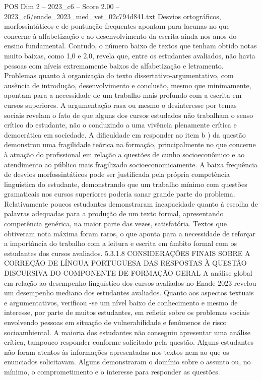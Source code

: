 \begin{textsample}{POS Dim 2 – 2023\_c6 – Score 2.00 – 2023\_c6/enade\_2023\_med\_vet\_02c794d841.txt}
Desvios ortográficos, morfossintáticos e de pontuação frequentes apontam para lacunas no que concerne à alfabetização e ao desenvolvimento da escrita ainda nos anos do ensino fundamental.
Contudo, o número baixo de textos que tenham obtido notas muito baixas, como 1,0 e 2,0, revela que, entre os estudantes avaliados, não havia pessoas com níveis extremamente baixos de alfabetização e letramento.
Problemas quanto à organização do texto dissertativo-argumentativo, com ausência de introdução, desenvolvimento e conclusão, mesmo que minimamente, apontam para a necessidade de um trabalho mais profundo com a escrita em cursos superiores.
A argumentação rasa ou mesmo o desinteresse por temas sociais revelam o fato de que alguns dos cursos estudados não trabalham o senso crítico do estudante, não o conduzindo a uma vivência plenamente crítica e democrática em sociedade.
A dificuldade em responder ao item b ) da questão demonstrou uma fragilidade teórica na formação, principalmente no que concerne à atuação do profissional em relação a questões de cunho socioeconômico e ao atendimento ao público mais fragilizado socioeconomicamente.
A baixa frequência de desvios morfossintáticos pode ser justificada pela própria competência linguística do estudante, demonstrando que um trabalho mínimo com questões gramaticais nos cursos superiores poderia sanar grande parte do problema.
Relativamente poucos estudantes demonstraram incapacidade quanto à escolha de palavras adequadas para a produção de um texto formal, apresentando competência genérica, na maior parte das vezes, satisfatória.
Textos que obtiveram nota máxima foram raros, o que aponta para a necessidade de reforçar a importância do trabalho com a leitura e escrita em âmbito formal com os estudantes dos cursos avaliados. 5.3.1.8 CONSIDERAÇÕES FINAIS SOBRE A CORREÇÃO DE LÍNGUA PORTUGUESA DAS RESPOSTAS À QUESTÃO DISCURSIVA DO COMPONENTE DE FORMAÇÃO GERAL A análise global em relação ao desempenho linguístico dos cursos avaliados no Enade 2023 revelou um desempenho mediano dos estudantes avaliados.
Quanto aos aspectos textuais e argumentativos, verificou -se um nível baixo de conhecimento e mesmo de interesse, por parte de muitos estudantes, em refletir sobre os problemas sociais envolvendo pessoas em situação de vulnerabilidade e fenômenos de risco socioambiental.
A maioria dos estudantes não conseguiu apresentar uma análise crítica, tampouco responder conforme solicitado pela questão.
Alguns estudantes não foram atentos às informações apresentadas nos textos nem ao que os enunciados solicitavam.
Alguns demonstraram o domínio sobre o assunto ou, no mínimo, o comprometimento e o interesse para responder as questões.

\end{textsample}
